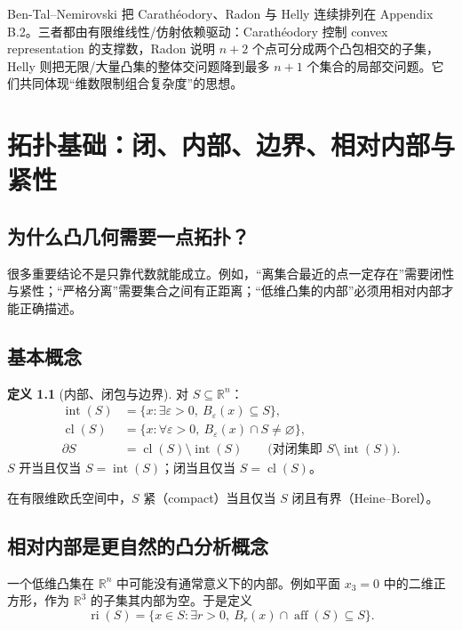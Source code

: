 \documentclass[11pt,a4paper,openany]{ctexrep}
\theoremstyle{definition}
\newtheorem{definition}[theorem]{定义}
\newcommand{\R}{\mathbb{R}}
\newcommand{\cl}{\operatorname{cl}}
\newcommand{\interior}{\operatorname{int}}
\newcommand{\ri}{\operatorname{ri}}
\newcommand{\aff}{\operatorname{aff}}
\newcommand{\eps}{\varepsilon}
\begin{document}
\begin{deepdivebox}
Ben-Tal--Nemirovski 把 Carath\'eodory、Radon 与 Helly 连续排列在 Appendix B.2。三者都由有限维线性/仿射依赖驱动：Carath\'eodory 控制 convex representation 的支撑数，Radon 说明 $n+2$ 个点可分成两个凸包相交的子集，Helly 则把无限/大量凸集的整体交问题降到最多 $n+1$ 个集合的局部交问题。它们共同体现“维数限制组合复杂度”的思想。\cite[Appendix~B.2.1--B.2.3]{bental}
\end{deepdivebox}

\chapter{拓扑基础：闭、内部、边界、相对内部与紧性}

\section{为什么凸几何需要一点拓扑？}
很多重要结论不是只靠代数就能成立。例如，“离集合最近的点一定存在”需要闭性与紧性；“严格分离”需要集合之间有正距离；“低维凸集的内部”必须用相对内部才能正确描述。

\section{基本概念}

\begin{definition}[内部、闭包与边界]
对 $S\subseteq\R^n$：
\begin{align*}
\interior(S)&=\{x:\exists\eps>0,\ B_\eps(x)\subseteq S\},\\
\cl(S)&=\{x:\forall\eps>0,\ B_\eps(x)\cap S\ne\varnothing\},\\
\partial S&=\cl(S)\setminus\interior(S)\qquad\text{(对闭集即 }S\setminus\interior(S)\text{)}.
\end{align*}
$S$ 开当且仅当 $S=\interior(S)$；闭当且仅当 $S=\cl(S)$。
\end{definition}

在有限维欧氏空间中，$S$ 紧（compact）当且仅当 $S$ 闭且有界（Heine--Borel）。

\section{相对内部是更自然的凸分析概念}
一个低维凸集在 $\R^n$ 中可能没有通常意义下的内部。例如平面 $x_3=0$ 中的二维正方形，作为 $\R^3$ 的子集其内部为空。于是定义
\[
\ri(S)=\{x\in S:\exists r>0,\ B_r(x)\cap\aff(S)\subseteq S\}.
\]
\end{document}
